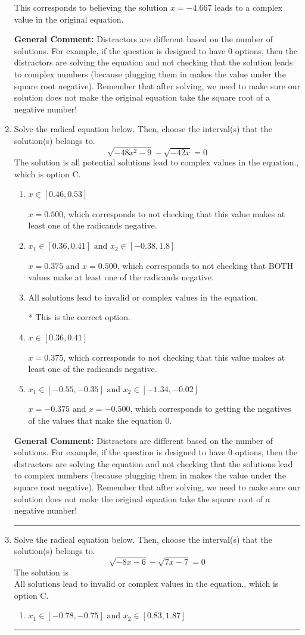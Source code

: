 \documentclass{extbook}[14pt]
\newcommand{\litem}[1]{\item #1

\rule{\textwidth}{0.4pt}}
\begin{document}
\begin{enumerate}
{\begin{enumerate}[label=\Alph*.]
This corresponds to believing the solution $x = -4.667$ leads to a complex value in the original equation.
\end{enumerate}

\textbf{General Comment:} Distractors are different based on the number of solutions. For example, if the question is designed to have 0 options, then the distractors are solving the equation and not checking that the solution leads to complex numbers (because plugging them in makes the value under the square root negative). Remember that after solving, we need to make sure our solution does not make the original equation take the square root of a negative number!
}
\litem{
Solve the radical equation below. Then, choose the interval(s) that the solution(s) belongs to.
\[ \sqrt{-48 x^2 - 9} - \sqrt{-42 x} = 0 \]The solution is \( \text{all potential solutions lead to complex values in the equation.} \), which is option C.\begin{enumerate}[label=\Alph*.]
\item \( x \in [0.46,0.53] \)

$x = 0.500$, which corresponds to not checking that this value makes at least one of the radicands negative.
\item \( x_1 \in [0.36, 0.41] \text{ and } x_2 \in [-0.38,1.8] \)

$x = 0.375 \text{ and } x = 0.500$, which corresponds to not checking that BOTH values make at least one of the radicands negative.
\item \( \text{All solutions lead to invalid or complex values in the equation.} \)

* This is the correct option.
\item \( x \in [0.36,0.41] \)

$x = 0.375$, which corresponds to not checking that this value makes at least one of the radicands negative.
\item \( x_1 \in [-0.55, -0.35] \text{ and } x_2 \in [-1.34,-0.02] \)

$x = -0.375 \text{ and } x = -0.500$, which corresponds to getting the negatives of the values that make the equation 0.
\end{enumerate}

\textbf{General Comment:} Distractors are different based on the number of solutions. For example, if the question is designed to have 0 options, then the distractors are solving the equation and not checking that the solutions lead to complex numbers (because plugging them in makes the value under the square root negative). Remember that after solving, we need to make sure our solution does not make the original equation take the square root of a negative number!
}
\litem{
Solve the radical equation below. Then, choose the interval(s) that the solution(s) belongs to.
\[ \sqrt{-8 x - 6} - \sqrt{7 x - 7} = 0 \]The solution is \( \text{All solutions lead to invalid or complex values in the equation.} \), which is option C.\begin{enumerate}[label=\Alph*.]
\item \( x_1 \in [-0.78, -0.75] \text{ and } x_2 \in [0.83,1.87] \)


\end{enumerate}}
\end{enumerate}
\end{document}
